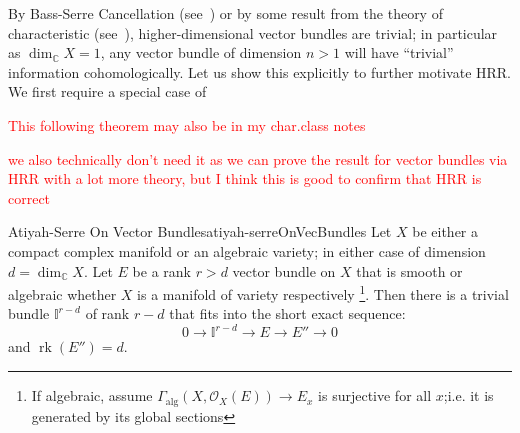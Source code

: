 \documentclass{book}
\newcommand{\C}{{\mathbb{C}}}
\newcommand{\BI}{{\mathbb{I}}}
\newcommand{\CO}{{\mathcal{O}}}
\newcommand{\alg}{{\operatorname{alg}}}
\newcommand{\rk}{{\operatorname{rk}}}
\begin{document}
By Bass-Serre Cancellation (see~\cite[section~5.1]{NateKTheory}) or by some result from the theory of
characteristic (see~\cite[section~3.2]{NateKTheory}), higher-dimensional vector bundles are trivial; in
particular as $\dim_\C X = 1$, any vector bundle of dimension $n > 1$ will have ``trivial'' information
cohomologically. Let us show this explicitly to further motivate HRR. We first require a special case of

\textcolor{red}{This following theorem may also be in my char.class notes}

\textcolor{red}{we also technically don't need it as we can prove the result for vector bundles via HRR with
a lot more theory, but I think this is good to confirm that HRR is correct}

\begin{thm}{Atiyah-Serre On Vector Bundles}{atiyah-serreOnVecBundles}
  Let $X$ be either a compact complex manifold or an algebraic variety; in either case of dimension $d
  =\dim_\C X$. Let $E$ be a rank $r> d$ vector bundle on $X$ that is smooth or algebraic whether $X$ is a
  manifold of variety respectively \footnote{If algebraic, assume $\Gamma_\alg(X, \CO_X(E)) \to E_x$ is
  surjective for all $x$;i.e. it is generated by its global sections}. Then there is a trivial bundle
  $\BI^{r-d}$ of rank $r-d$  that fits into the short exact sequence:
  \[
    0 \to \BI^{r-d} \to E \to E'' \to 0
  \]
  and $\rk(E'') = d$.
\end{thm}
\end{document}
